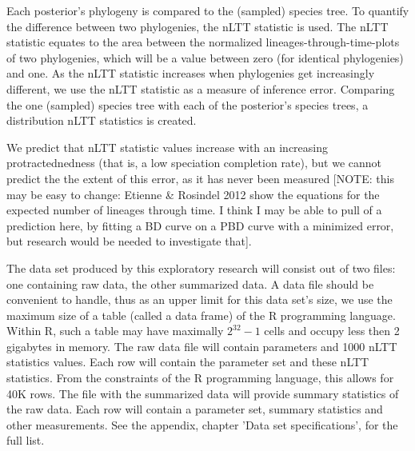\documentclass{article}
\begin{document}
Each posterior's phylogeny is compared to the (sampled) species tree.
To quantify the difference between two phylogenies, the nLTT statistic
is used. The nLTT statistic equates to the area between the normalized
lineages-through-time-plots of two phylogenies, which will be a value between 
zero (for identical phylogenies) and one. As the nLTT statistic increases
when phylogenies get increasingly different, we use the nLTT statistic
as a measure of inference error. Comparing the one (sampled) species tree
with each of the posterior's species trees, a distribution nLTT statistics
is created. 

We predict that nLTT statistic values increase 
with an increasing protractednedness (that is, a low speciation completion rate),
but we cannot predict the the extent of this error, as it has never been 
measured [NOTE: this may be easy to change: Etienne \& Rosindel 2012 show the equations
for the expected number of lineages through time. I think I may be able to pull
of a prediction here, by fitting a BD curve on a PBD curve with a minimized error,
but research would be needed to investigate that].

The data set produced by this exploratory research will consist out of two files:
one containing raw data, the other summarized data. 
A data file should be convenient to handle, thus as an upper limit for this data set's size, 
we use the maximum size of a table (called a data frame) of the R programming 
language. Within R, such a table may have maximally $2^{32}-1$ cells and occupy
less then 2 gigabytes in memory. 
The raw data file will contain parameters and 1000 nLTT statistics values.
Each row will contain the parameter set and these nLTT statistics.
From the constraints of the R programming language, this allows for 40K rows. 
The file with the summarized data will provide summary statistics of the raw
data. Each row will contain a parameter set, summary statistics and other
measurements. See the appendix, chapter 'Data set specifications', for the full list.
\end{document}
